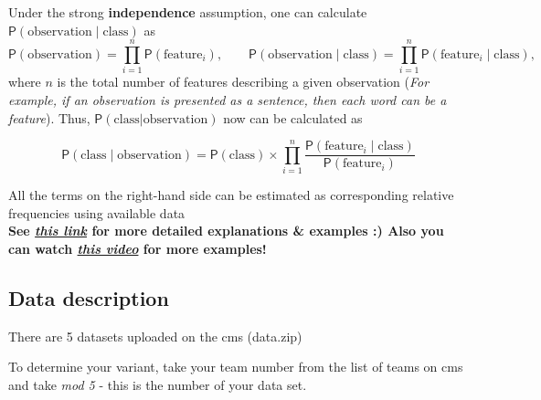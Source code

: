 \documentclass[
]{article}
\begin{document}
Under the strong \textbf{independence} assumption, one can calculate
\(\mathsf{P}(\mathrm{observation} \mid \mathrm{class})\) as
\[\mathsf{P}(\mathrm{observation}) = \prod_{i=1}^{n} \mathsf{P}(\mathrm{feature}_i), \qquad \mathsf{P}(\mathrm{observation} \mid \mathrm{class}) = \prod_{i=1}^{n} \mathsf{P}(\mathrm{feature}_i \mid \mathrm{class}),\]
where \(n\) is the total number of features describing a given
observation (\emph{For example, if an observation is presented as a
sentence, then each word can be a feature}). Thus,
\(\mathsf{P}(\mathrm{class}|\mathrm{observation})\) now can be
calculated as

\[\mathsf{P}(\mathrm{class} \mid \mathrm{\mathrm{observation}}) = \mathsf{P}(\mathrm{class})\times \prod_{i=1}^{n}\frac{\mathsf{P}(\mathrm{feature}_i\mid \mathrm{class})}{\mathsf{P}(\mathrm{feature}_i)}\tag{1}\]

All the terms on the right-hand side can be estimated as corresponding
relative frequencies using available data\\

\textbf{See
\href{https://www.javatpoint.com/machine-learning-naive-bayes-classifier}{\emph{this
link}} for more detailed explanations \& examples :) Also you can watch
\href{https://youtu.be/O2L2Uv9pdDA?si=-ohkHVDuu3sLLGMq}{\emph{this
video}} for more examples!}

\subsection{Data description}\label{data-description}

There are 5 datasets uploaded on the cms (data.zip)

To determine your variant, take your team number from the list of teams
on cms and take \emph{mod 5} - this is the number of your data set.
\end{document}
